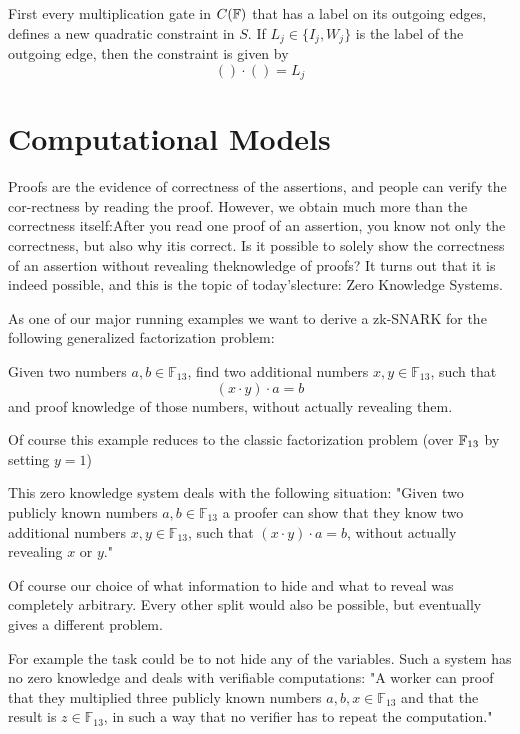 First every multiplication gate in $C(\mathbb{F})$ that has a label on its outgoing edges, defines a new quadratic constraint in $S$. If $L_j\in\{I_j,W_j\}$ is the label of the outgoing edge, then the constraint is given by
\begin{equation}
()\cdot () = L_j
\end{equation}  


 





\section{Computational Models}
Proofs are the evidence of correctness of the assertions, and people can verify the cor-rectness by reading the proof. However, we obtain much more than the correctness itself:After you read one proof of an assertion, you know not only the correctness, but also why itis correct. Is it possible to solely show the correctness of an assertion without revealing theknowledge of proofs? It turns out that it is indeed possible, and this is the topic of today’slecture: Zero Knowledge Systems.

\begin{example}
\label{main_example_2_1}
As one of our major running examples we want to derive a zk-SNARK for the following generalized factorization problem: 

Given two numbers $a,b\in \mathbb{F}_{13}$, find two additional numbers $x,y\in \mathbb{F}_{13}$, such that
$$
(x\cdot y) \cdot a = b 
$$
and proof knowledge of those numbers, without actually revealing them.

Of course this example reduces to the classic factorization problem (over $\mathbb{F}_{13}$ by setting $y=1$)

This zero knowledge system deals with the following situation: "Given two publicly known numbers $a,b \in \mathbb{F}_{13}$ a proofer can show that they know two additional numbers $x,y\in \mathbb{F}_{13}$, such that $(x\cdot y) \cdot a = b$, without actually revealing $x$ or $y$." 

Of course our choice of what information to hide and what to reveal was completely arbitrary. Every other split would also be possible, but eventually gives a different problem. 

For example the task could be to not hide any of the variables.  Such 
a system has no zero knowledge and deals with verifiable computations: "A worker can proof that they multiplied three publicly known numbers $a,b,x \in \mathbb{F}_{13}$ and that the result is $z \in \mathbb{F}_{13}$, in such a way that no verifier has to repeat the computation."
\end{example}


